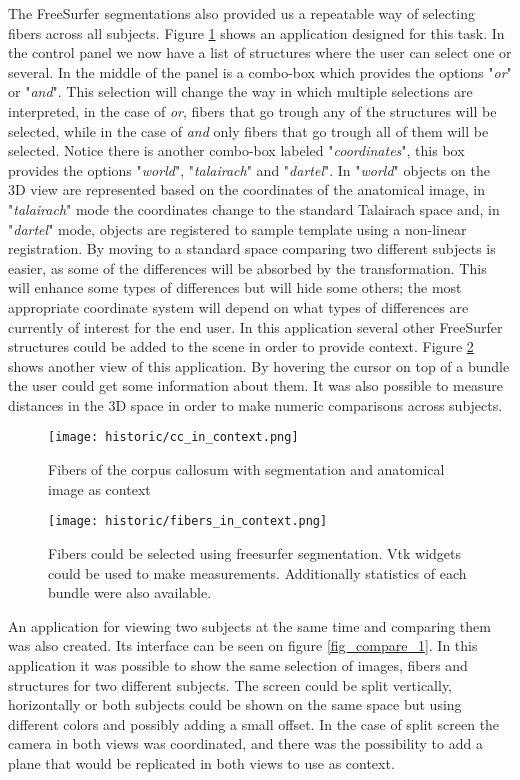 The FreeSurfer segmentations also provided us a repeatable way of selecting fibers across all subjects. Figure \ref{fig_cc_ctx_1} shows an application designed for this task. In the control panel we now have a list of structures where the user can select one or several. In the middle of the panel is a combo-box which provides the options "\emph{or}" or "\emph{and}". This selection will change the way in which multiple selections are interpreted, in the case of \emph{or}, fibers that go trough any of the structures will be selected, while in the case of \emph{and} only fibers that go trough all of them will be selected. Notice there is another combo-box labeled "\emph{coordinates}", this box provides the options "\emph{world}", "\emph{talairach}" and "\emph{dartel}". In "\emph{world}" objects on the 3D view are represented based on the coordinates of the anatomical image, in "\emph{talairach}" mode the coordinates change to the standard Talairach space and, in "\emph{dartel}" mode, objects are registered to sample template using a non-linear registration. By moving to a standard space comparing two different subjects is easier, as some of the differences will be absorbed by the transformation. This will enhance some types of differences but will hide some others; the most appropriate coordinate system will depend on what types of differences are currently of interest for the end user. In this application several other FreeSurfer structures could be added to the scene in order to provide context. Figure \ref{fig_fibers_ctx} shows another view of this application. By hovering the cursor on top of a bundle the user could get some information about them. It was also possible to measure distances in the 3D space in order to make numeric comparisons across subjects.

\begin{figure}
\centering
\texttt{[image: historic/cc\_in\_context.png]} 
\caption{\label{fig_cc_ctx_1}Fibers of the corpus callosum with segmentation and anatomical image as context}
\end{figure}

\begin{figure}
\centering
\texttt{[image: historic/fibers\_in\_context.png]} 
\caption{\label{fig_fibers_ctx}Fibers could be selected using freesurfer segmentation. Vtk widgets could be used to make measurements.
Additionally statistics of each bundle were also available.}
\end{figure}

An application for viewing two subjects at the same time and comparing them was also created. Its interface can be seen on figure \ref{fig_compare_1}. In this application it was possible to show the same selection of images, fibers and structures for two different subjects. The screen could be split vertically, horizontally or both subjects could be shown on the same space but using different colors and possibly adding a small offset. In the case of split screen the camera in both views was coordinated, and there was the possibility to add a plane that would be replicated in both views to use as context.

